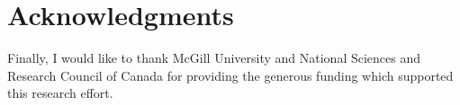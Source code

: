 %
%
%

\section*{Acknowledgments}

Finally, I would like to thank McGill University and National Sciences and
Research Council of Canada for providing the generous funding which supported
this research effort.

\clearpage
